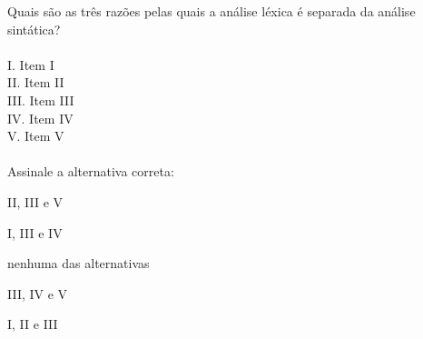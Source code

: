\question[10]

Quais são as três razões pelas quais a análise léxica é separada da análise sintática?\\
\\
I. Item I\\
II. Item II\\
III. Item III\\
IV. Item IV\\
V. Item V\\
\\
Assinale a alternativa correta:
\begin{choices}
\item II, III e V %
\item I, III e IV
\item nenhuma das alternativas
\item III, IV e V
\item I, II e III
\end{choices}
\answerline

